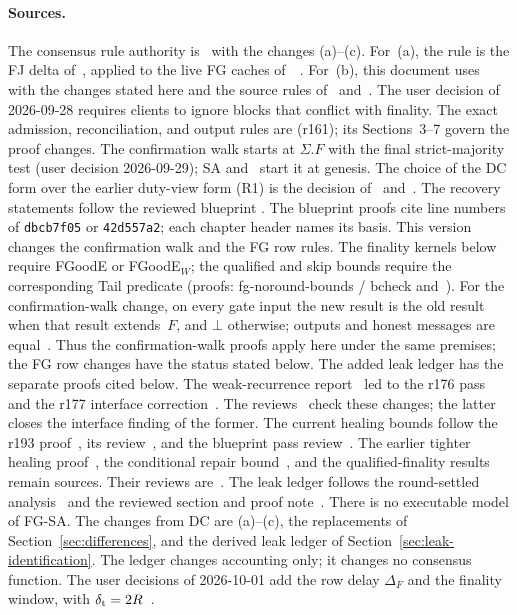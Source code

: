 \documentclass{article}
\theoremstyle{plain}
\theoremstyle{definition}
\theoremstyle{remark}
\newcommand{\DC}[1]{\cite[\S#1]{DC}}
\newcommand{\SAS}{\cite{SAS}}
\newcommand{\ADJ}[1]{\cite[\S#1]{ADJ}}
\newcommand{\FAST}[1]{\cite[\S#1]{FAST}}
\newcommand{\FJ}[1]{\cite[\S#1]{FJ}}
\newcommand{\LDP}[1]{\cite[\S#1]{LDP}}
\newcommand{\LV}[1]{\cite[\S#1]{LV}}
\begin{document}
\paragraph{Sources.}
The consensus rule authority is~\DC{7} with the changes (a)--(c).  For~(a),
the rule is the FJ delta of~\FJ{2}, applied to the live FG caches
of~\cite{DC}~\LDP{1}.  For~(b), this document uses~\SAS{} with the changes stated here and the
source rules of~\FAST{3} and~\ADJ{2}.  The user decision of
2026-09-28 requires clients to ignore blocks that conflict with finality.
The exact admission, reconciliation, and output rules are
\cite[\S2]{FB} (r161); its Sections~3--7 govern the proof changes.
The confirmation walk starts at $\Sigma.F$ with the final
strict-majority test (user decision 2026-09-29); SA and~\cite[\S2]{FB}
start it at genesis.  The choice of the DC form over the
earlier duty-view form (R1) is the decision of~\LDP{1} and~\LV{2,7}.
The recovery statements follow the reviewed blueprint
\cite{BPO,BPH,BPF}.  The blueprint proofs cite line numbers of \texttt{dbcb7f05} or
\texttt{42d557a2}; each chapter header names its basis.  This version changes the confirmation walk and the FG row rules.
The finality kernels below require FGoodE or FGoodE$_W$; the qualified and skip bounds require the corresponding Tail predicate (proofs: fg-noround-bounds / bcheck and~\cite[\S5]{FW}).  For the confirmation-walk change, on every gate
input the new result is the old result when that result extends~$F$,
and $\bot$ otherwise; outputs and honest messages are
equal~\cite{GF208,GF208R}.  Thus the confirmation-walk proofs apply here under the same
premises; the FG row changes have the status stated below.  The added
leak ledger has the separate proofs cited below.  The weak-recurrence report~\cite{WR174} led to
the r176 pass~\cite{BP176} and the r177 interface correction~\cite{BP177}.
The reviews~\cite{BPR,BPHR} check these changes; the latter closes the
interface finding of the former.  The current healing bounds follow the
r193 proof~\cite{HG193}, its review~\cite{HGR}, and the blueprint pass
review~\cite{BPR197}.  The earlier tighter healing proof~\cite{TH178},
the conditional repair bound~\cite{OR180}, and the qualified-finality
results~\cite{QF181} remain sources.  Their reviews are~\cite{THR,BBR,QFR}.  The leak ledger follows
the round-settled analysis~\cite{RL179,RLR} and the reviewed section
and proof note~\cite{LS183,LSR}.
There is no executable model of FG-SA.  The changes from DC are
(a)--(c), the replacements of Section~\ref{sec:differences}, and the
derived leak ledger of Section~\ref{sec:leak-identification}.
The ledger changes accounting only; it changes no consensus function.
The user decisions of 2026-10-01 add the row delay $\Delta_F$ and
the finality window, with $\delta_{\rm t}=2R$~\cite{RD,FW}.
\end{document}
